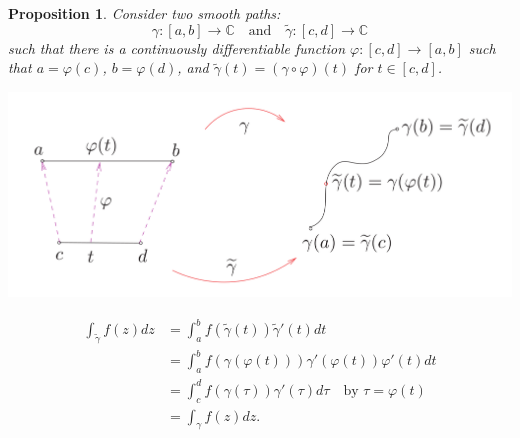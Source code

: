 \documentclass[12pt,openany]{book}
\newtheorem{proposition}[theorem]{Proposition}
\theoremstyle{definition}
\newcommand{\C}{\mathbb{C}}
\newcommand{\of}[1]{\left( #1 \right)}
\begin{document}
	\begin{tcolorbox}[colback=white,colframe=procolor,arc=5pt,title={\color{white}\bf Equivalent paths give the same integral}]
		\begin{proposition}
			Consider two smooth paths: \[
			\gamma:[a,b]\to\C\quad\text{and}
			\quad\tilde{\gamma}:[c,d]\to\C
			\] such that there is a continuously differentiable function $\varphi:[c,d]\to[a,b]$ such that $a=\varphi\of{c}$, $b=\varphi\of{d}$, and $\tilde{\gamma}\of{t}=\of{\gamma\circ\varphi}\of{t}$ for $t\in[c,d]$. 
			\begin{center}
				\includegraphics[scale=0.25]{equivalent_paths.png}
			\end{center}
			\begin{align*}
				\int_{\tilde{\gamma}}f\of{z}dz
				&=\int_a^bf\of{\tilde{\gamma}\of{t}}{\tilde{\gamma}'\of{t}}dt \\
				&=\int_a^bf\of{\gamma\of{\varphi\of{t}}}\gamma'\of{\varphi\of{t}}\varphi'\of{t}dt\\
				&=\int_c^df\of{\gamma\of{\tau}}\gamma'\of{\tau}d\tau\quad\text{by $\tau=\varphi\of{t}$}\\
				&=\int_{\gamma}f\of{z}dz.
			\end{align*}
		\end{proposition}
	\end{tcolorbox}
	
\end{document}
